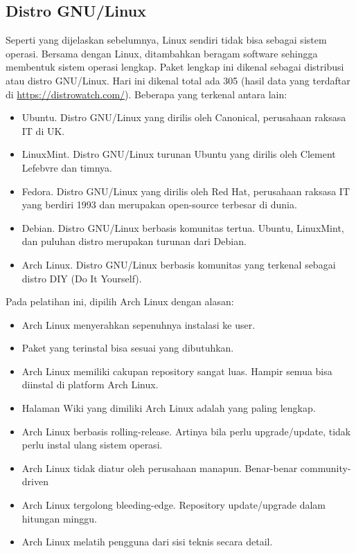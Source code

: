 \documentclass[12pt,]{article}
\begin{document}
	\subsection{Distro GNU/Linux}
	Seperti yang dijelaskan sebelumnya, Linux sendiri tidak bisa sebagai sistem operasi.
	Bersama dengan Linux, ditambahkan beragam software sehingga membentuk sistem operasi lengkap.
	Paket lengkap ini dikenal sebagai distribusi atau distro GNU/Linux.
	Hari ini dikenal total ada 305 (hasil data yang terdaftar di \url{https://distrowatch.com/}).
	Beberapa yang terkenal antara lain:
	\begin{itemize}
		\item Ubuntu. Distro GNU/Linux yang dirilis oleh Canonical, perusahaan raksasa IT di UK.
		\item LinuxMint. Distro GNU/Linux turunan Ubuntu yang dirilis oleh Clement Lefebvre dan timnya.
		\item Fedora. Distro GNU/Linux yang dirilis oleh Red Hat, perusahaan raksasa IT yang berdiri 1993 dan merupakan open-source terbesar di dunia.
		\item Debian. Distro GNU/Linux berbasis komunitas tertua. Ubuntu, LinuxMint, dan puluhan distro merupakan turunan dari Debian.
		\item Arch Linux. Distro GNU/Linux berbasis komunitas yang terkenal sebagai distro DIY (Do It Yourself).
	\end{itemize}
	
	Pada pelatihan ini, dipilih Arch Linux dengan alasan:
	\begin{itemize}
		\item Arch Linux menyerahkan sepenuhnya instalasi ke user.
		\item Paket yang terinstal bisa sesuai yang dibutuhkan. 
		\item Arch Linux memiliki cakupan repository sangat luas.
		Hampir semua bisa diinstal di platform Arch Linux.
		\item Halaman Wiki yang dimiliki Arch Linux adalah yang paling lengkap.
		\item Arch Linux berbasis rolling-release.
		Artinya bila perlu upgrade/update, tidak perlu instal ulang sistem operasi.
		\item Arch Linux tidak diatur oleh perusahaan manapun. 
		Benar-benar community-driven
		\item Arch Linux tergolong bleeding-edge. Repository update/upgrade dalam hitungan minggu.
		\item Arch Linux melatih pengguna dari sisi teknis secara detail.
	\end{itemize}
\end{document}
